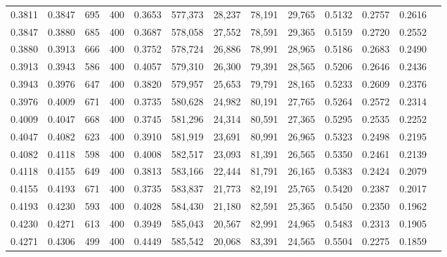 \begin{tabular}{rrrrrrrrrrrrr}
0.3811 & 0.3847 &    695 &   400 &                                     0.3653 & 577,373 &  28,237 &  78,191 &  29,765 & 0.5132 & 0.2757 & 0.2616 \\
0.3847 & 0.3880 &    685 &   400 &                                     0.3687 & 578,058 &  27,552 &  78,591 &  29,365 & 0.5159 & 0.2720 & 0.2552 \\
0.3880 & 0.3913 &    666 &   400 &                                     0.3752 & 578,724 &  26,886 &  78,991 &  28,965 & 0.5186 & 0.2683 & 0.2490 \\
0.3913 & 0.3943 &    586 &   400 &                                     0.4057 & 579,310 &  26,300 &  79,391 &  28,565 & 0.5206 & 0.2646 & 0.2436 \\
0.3943 & 0.3976 &    647 &   400 &                                     0.3820 & 579,957 &  25,653 &  79,791 &  28,165 & 0.5233 & 0.2609 & 0.2376 \\
0.3976 & 0.4009 &    671 &   400 &                                     0.3735 & 580,628 &  24,982 &  80,191 &  27,765 & 0.5264 & 0.2572 & 0.2314 \\
0.4009 & 0.4047 &    668 &   400 &                                     0.3745 & 581,296 &  24,314 &  80,591 &  27,365 & 0.5295 & 0.2535 & 0.2252 \\
0.4047 & 0.4082 &    623 &   400 &                                     0.3910 & 581,919 &  23,691 &  80,991 &  26,965 & 0.5323 & 0.2498 & 0.2195 \\
0.4082 & 0.4118 &    598 &   400 &                                     0.4008 & 582,517 &  23,093 &  81,391 &  26,565 & 0.5350 & 0.2461 & 0.2139 \\
0.4118 & 0.4155 &    649 &   400 &                                     0.3813 & 583,166 &  22,444 &  81,791 &  26,165 & 0.5383 & 0.2424 & 0.2079 \\
0.4155 & 0.4193 &    671 &   400 &                                     0.3735 & 583,837 &  21,773 &  82,191 &  25,765 & 0.5420 & 0.2387 & 0.2017 \\
0.4193 & 0.4230 &    593 &   400 &                                     0.4028 & 584,430 &  21,180 &  82,591 &  25,365 & 0.5450 & 0.2350 & 0.1962 \\
0.4230 & 0.4271 &    613 &   400 &                                     0.3949 & 585,043 &  20,567 &  82,991 &  24,965 & 0.5483 & 0.2313 & 0.1905 \\
0.4271 & 0.4306 &    499 &   400 &                                     0.4449 & 585,542 &  20,068 &  83,391 &  24,565 & 0.5504 & 0.2275 & 0.1859 \\

\end{tabular}
